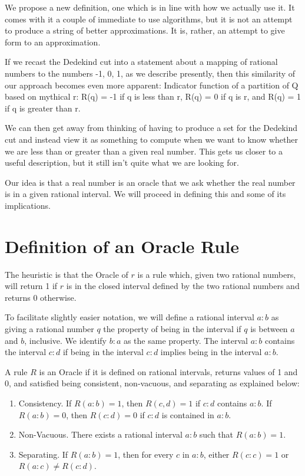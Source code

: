 \documentclass[12pt]{article}
\newcommand{\1}{\mathbf{1}} %
\begin{document}
We propose a new definition, one which is in line with how we actually use it.
It comes with it a couple of immediate to use algorithms, but it is not an
attempt to produce a string of better approximations. It is, rather, an
attempt to give form to an approximation.

If we recast the Dedekind cut into a statement about a mapping of rational
numbers to the numbers -1, 0, 1, as we describe presently, then this
similarity of our approach becomes even more apparent: 
Indicator function of a partition of Q based on mythical r: 
R(q) = -1 if q is less than r, R(q) = 0 if q is r, and R(q) = 1 if q is
greater than r. 

We can then get away from thinking of having to produce a set for the Dedekind
cut and instead view it as something to compute when we want to know whether
we are less than or greater than a given real number. This gets us closer to a
useful description, but it still isn't quite what we are looking for. 

Our idea is that a real number is an oracle that we ask whether the real
number is in a given rational interval. We will proceed in defining this and
some of its implications. 



\section{Definition of an Oracle Rule}\label{sec:ora}

The heuristic is that the Oracle of $r$ is a rule which, given two rational numbers, will return 1 if
$r$ is in the closed interval defined by the two rational numbers and returns 0
otherwise. 

To facilitate slightly easier notation, we will define a rational interval $a:b$ as giving a rational number $q$ the property of being in the interval if $q$ is between $a$ and $b$, inclusive. We identify $b:a$ as the same property. The interval $a:b$ contains the interval $c:d$ if being in the interval $c:d$ implies being in the interval $a:b$. 

A rule $R$ is an Oracle if it is defined on rational intervals, returns values of 1
and 0, and satisfied being consistent, non-vacuous, and separating
as explained below: 
\begin{enumerate}
    \item Consistency. If $R(a:b) = 1$, then $R(c,d) = 1$ if $c:d$ contains $a:b$. If $R(a:b)= 0$, then $R(c:d)=0$ if $c:d$ is contained in $a:b$.
    \item Non-Vacuous. There exists a rational interval $a:b$ such that $R(a:b) = 1$.
    \item Separating. If $R(a:b)=1$, then for every $c$ in $a:b$, either $R(c:c) = 1$ or $R(a:c) \neq R(c:d)$.
\end{enumerate}
\end{document}
